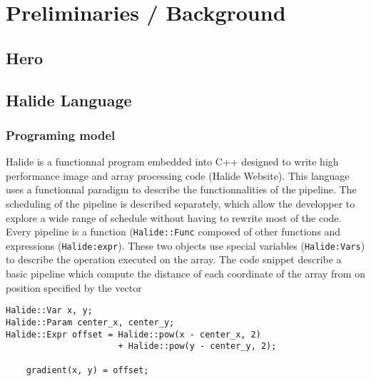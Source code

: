 
\chapter{Preliminaries / Background}
\section{Hero}

\section{Halide Language}
	\subsection { Programing model}
		Halide is a functionnal program embedded into C++ designed to write high performance image and array processing code (Halide Website). This language uses a functionnal paradigm to describe the functionnalities of the pipeline. The scheduling of the pipeline is described separately, which allow the developper to explore a wide range of schedule without having to rewrite most of the code. 
		Every pipeline is a function (\verb|Halide::Func| composed of other functions and expressions (\verb|Halide:expr|). These two objects  use special variables (\verb|Halide:Vars|) to describe the operation executed on the array. The code snippet 
		describe a basic pipeline which compute the distance of each coordinate of the array from on position specified by the vector %


\lstset{basicstyle=\ttfamily\footnotesize,breaklines=true,tabsize=2}
\begin{lstlisting}[caption={Simple Pipeline Example}, captionpos=b, label={code:simple_pipeline}]
Halide::Var x, y;
Halide::Param center_x, center_y;
Halide::Expr offset = Halide::pow(x - center_x, 2) 
                      + Halide::pow(y - center_y, 2);

	gradient(x, y) = offset;
\end{lstlisting}

